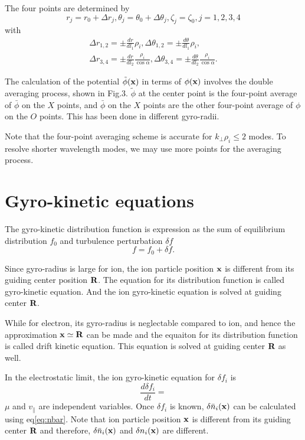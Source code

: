 \documentclass{report}
\newcommand{\ff}[2]{\frac{#1}{#2}}
\def\R{\mbox{\bf R}}
\def\x{\mbox{\bf x}}
\begin{document}
The four points are determined by
$$
r_j = r_0 + \Delta r_j,
\theta_j = \theta_0 + \Delta \theta_j,
\zeta_j = \zeta_0, 
j = 1, 2, 3, 4
$$
with
$$
\begin{array}{l}
\Delta r_{1,2} = \pm \ff{dr}{dl_1} \rho_i,
\Delta \theta_{1,2} = \pm \ff{d\theta}{dl_1} \rho_i,
\\
\Delta r_{3,4} = \pm \ff{dr}{dl_2} \ff{\rho_i}{\cos\alpha},
\Delta \theta_{3,4} = \pm \ff{d\theta}{dl_2} \ff{\rho_i}{\cos\alpha}.
\end{array}
$$

The calculation of the potential 
$\tilde{\phi}(\x)$ in terms of $\phi(\x)$ involves
the double averaging process, shown in Fig.3.
$\tilde{\phi}$ at the center point is the four-point average of
$\bar{\phi}$ on the $X$ points,
and 
$\bar{\phi}$ on the $X$ points are the other four-point average of $\phi$ on the $O$ points.
This has been done in different gyro-radii.

Note that the four-point averaging scheme is accurate for
$k_\perp \rho_i \leq 2$
modes.
To resolve shorter wavelength modes, we may use more points for the averaging process.

\section{Gyro-kinetic equations}

The gyro-kinetic distribution function is expression as the sum of 
equilibrium distribution $f_0$ and turbulence perturbation $\delta f$
$$
f = f_0 + \delta f.
$$

Since gyro-radius is large for ion, the ion particle position $\x$
is different from its guiding center position $\R$. The equation for its 
distribution function is called gyro-kinetic equation.
And the ion gyro-kinetic equation is solved at guiding center $\R$.

While for electron, its gyro-radius is neglectable compared to ion,
and hence the approximation $\x \simeq \R$ can be made and the equaiton
for its distribution function is called drift kinetic equation.
This equation is solved at guiding center $\R$ as well.

In the electrostatic limit, the ion gyro-kinetic equation for $\delta f_i$ is
\begin{equation}
\label{eq:iongyroeq}
\ff{d \delta f_i}{dt} =
\end{equation}
$\mu$ and $v_\parallel$ are independent variables.
Once $\delta f_i$ is known, 
$\delta \bar{n}_i(\x)$ can be calculated using eq\ref{eq:nbar}.
Note that ion particle position $\x$ is different from its guiding center $\R$
and therefore, $\delta \bar{n}_i(\x)$ and $\delta n_i(\x)$ are different.
\end{document}
